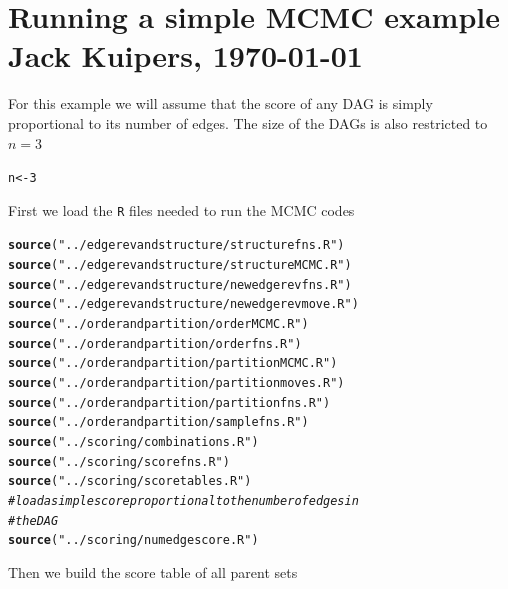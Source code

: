 \documentclass[a4paper]{article}\usepackage[]{graphicx}\usepackage[]{color}
\makeatletter
\newcommand{\hlnum}[1]{\textcolor[rgb]{0.686,0.059,0.569}{#1}}%
\newcommand{\hlstr}[1]{\textcolor[rgb]{0.192,0.494,0.8}{#1}}%
\newcommand{\hlcom}[1]{\textcolor[rgb]{0.678,0.584,0.686}{\textit{#1}}}%
\newcommand{\hlstd}[1]{\textcolor[rgb]{0.345,0.345,0.345}{#1}}%
\newcommand{\hlkwb}[1]{\textcolor[rgb]{0.69,0.353,0.396}{#1}}%
\newcommand{\hlkwd}[1]{\textcolor[rgb]{0.737,0.353,0.396}{\textbf{#1}}}%
\newenvironment{kframe}{%
 \def\at@end@of@kframe{}%
 \ifinner\ifhmode%
  \def\at@end@of@kframe{\end{minipage}}%
  \begin{minipage}{\columnwidth}%
 \fi\fi%
 \def\FrameCommand##1{\hskip\@totalleftmargin \hskip-\fboxsep
 \colorbox{shadecolor}{##1}\hskip-\fboxsep
     \hskip-\linewidth \hskip-\@totalleftmargin \hskip\columnwidth}%
 \MakeFramed {\advance\hsize-\width
   \@totalleftmargin\z@ \linewidth\hsize
   \@setminipage}}%
 {\par\unskip\endMakeFramed%
 \at@end@of@kframe}
\newenvironment{knitrout}{}{} %
\newcommand{\nn}{\noindent}
\makeatother
\begin{document}
\section*{Running a simple MCMC example \hfill \normalsize{\textnormal{Jack Kuipers, \today}}}

\nn For this example we will assume that the score of any DAG is simply proportional to its number of edges.  The size of the DAGs is also restricted to $n=3$

\begin{knitrout}
\color{fgcolor}\begin{kframe}
\begin{alltt}
\hlstd{n} \hlkwb{<-} \hlnum{3}
\end{alltt}
\end{kframe}
\end{knitrout}

\nn First we load the \texttt{R} files needed to run the MCMC codes
\begin{knitrout}
\color{fgcolor}\begin{kframe}
\begin{alltt}
\hlkwd{source}\hlstd{(}\hlstr{"../edgerevandstructure/structurefns.R"}\hlstd{)}
\hlkwd{source}\hlstd{(}\hlstr{"../edgerevandstructure/structureMCMC.R"}\hlstd{)}
\hlkwd{source}\hlstd{(}\hlstr{"../edgerevandstructure/newedgerevfns.R"}\hlstd{)}
\hlkwd{source}\hlstd{(}\hlstr{"../edgerevandstructure/newedgerevmove.R"}\hlstd{)}
\hlkwd{source}\hlstd{(}\hlstr{"../orderandpartition/orderMCMC.R"}\hlstd{)}
\hlkwd{source}\hlstd{(}\hlstr{"../orderandpartition/orderfns.R"}\hlstd{)}
\hlkwd{source}\hlstd{(}\hlstr{"../orderandpartition/partitionMCMC.R"}\hlstd{)}
\hlkwd{source}\hlstd{(}\hlstr{"../orderandpartition/partitionmoves.R"}\hlstd{)}
\hlkwd{source}\hlstd{(}\hlstr{"../orderandpartition/partitionfns.R"}\hlstd{)}
\hlkwd{source}\hlstd{(}\hlstr{"../orderandpartition/samplefns.R"}\hlstd{)}
\hlkwd{source}\hlstd{(}\hlstr{"../scoring/combinations.R"}\hlstd{)}
\hlkwd{source}\hlstd{(}\hlstr{"../scoring/scorefns.R"}\hlstd{)}
\hlkwd{source}\hlstd{(}\hlstr{"../scoring/scoretables.R"}\hlstd{)}
\hlcom{# load a simple score proportional to the number of edges in}
\hlcom{# the DAG}
\hlkwd{source}\hlstd{(}\hlstr{"../scoring/numedgescore.R"}\hlstd{)}
\end{alltt}
\end{kframe}
\end{knitrout}

\nn Then we build the score table of all parent sets
\end{document}
